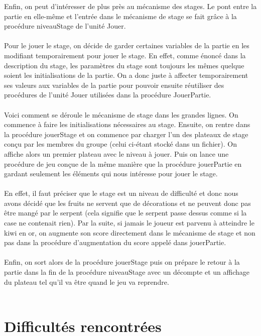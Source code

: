 \documentclass[11pt,a4paper]{article}
\begin{document}
        Enfin, on peut d’intéresser de plus près au mécanisme des stages. Le pont entre la partie en elle-même et l’entrée dans le mécanisme de stage se fait grâce à la procédure niveauStage de l’unité Jouer.\\\\
        Pour le jouer le stage, on décide de garder certaines variables de la partie en les modifiant temporairement pour jouer le stage. En effet, comme énoncé dans la description du stage, les paramètres du stage sont toujours les mêmes quelque soient les initialisations de la partie. On a donc juste à affecter temporairement ses valeurs aux variables de la partie pour pouvoir ensuite réutiliser des procédures de l’unité Jouer utilisées dans la procédure JouerPartie. \\\\
        Voici comment se déroule le mécanisme de stage dans les grandes lignes. On commence à faire les initialisations nécessaires au stage. Ensuite, on rentre dans la procédure jouerStage et on  commence par charger l’un des plateaux de stage conçu par les membres du groupe (celui ci-étant stocké dans un fichier). On affiche alors un premier plateau avec le niveau à jouer. Puis on lance une procédure de jeu conçue de la même manière que la procédure jouerPartie en gardant seulement  les éléments qui nous intéresse pour jouer le stage. \\\\
        En effet, il faut préciser que le stage est un niveau de difficulté et donc nous avons décidé que les fruits ne servent que de décorations et ne peuvent donc pas être mangé par le serpent (cela signifie que le serpent passe dessus comme si la case ne contenait rien). Par la suite, si jamais le joueur est parvenu à atteindre le kiwi en or, on augmente son score directement dans le mécanisme de stage et non pas dans la procédure d’augmentation du score appelé dans jouerPartie.\\\\
        Enfin, on sort alors de la procédure jouerStage puis on prépare le retour à la partie dans la fin de la procédure niveauStage avec un décompte et un affichage du plateau tel qu’il va être quand le jeu va reprendre. \\\\
        
        \newpage
        \section{Difficultés rencontrées}
        
\end{document}
